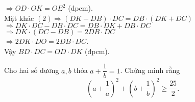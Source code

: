 \begin{ex}
{\begin{enumerate}[1.]
\begin{enumerate}[a)]
			$\Rightarrow OD\cdot OK = OE^2$ (đpcm). \\
			Mặt khác $(2) \Rightarrow (DK-DB) \cdot DC = DB \cdot (DK + DC)$ \\
			$\Rightarrow DK \cdot DC - DB \cdot DC = DB \cdot DK + DB \cdot DC$\\
			$\Rightarrow DK \cdot (DC - DB) = 2 DB \cdot DC$ \\
			$\Rightarrow 2 DK \cdot DO =2 DB \cdot DC$. 
			\\ Vậy $BD\cdot DC = OD \cdot DK$ (đpcm).
		\end{enumerate}
			\end{enumerate}
	}
\end{ex}

\begin{ex}%
	Cho hai số dương $a,b$ thỏa $a+\dfrac{1}{b}=1$. Chứng minh rằng $$\left( a+\dfrac{1}{a} \right)^2+\left( b+\dfrac{1}{b}\right)^2\geqslant \dfrac{25}{2} .$$
\end{ex}

